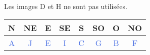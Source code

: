 \begin{Maquette}[Fiche,CorrigeFin,Colonnes=2]{}
\begin{multicols}{2}
      \begin{Solution}
         Les images D et H ne sont pas utilisées. \par \smallskip
         {\small{}
         \begin{tabular}{|*{8}{C{0.55}|}}
            \hline
            N & NE & E & SE & S & SO & O & NO \\
            \hline
            \textcolor{RoyalBlue}{A} & \textcolor{RoyalBlue}{J} & \textcolor{RoyalBlue}{E} & \textcolor{RoyalBlue}{I} & \textcolor{RoyalBlue}{C} & \textcolor{RoyalBlue}{G} & \textcolor{RoyalBlue}{B} & \textcolor{RoyalBlue}{F} \\
            \hline
         \end{tabular}}
      \end{Solution} 
         
   \end{multicols}
         

\end{Maquette}
